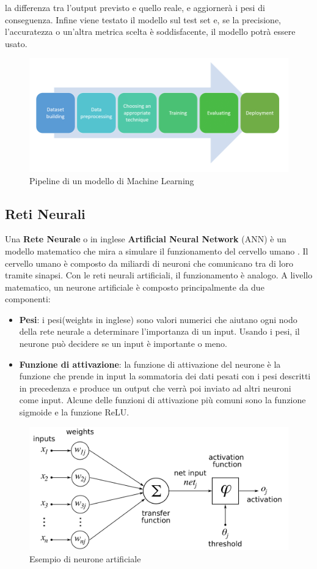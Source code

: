 \documentclass[12pt,a4paper,openright,twoside]{book}
\begin{document}
la differenza tra l'output previsto e quello reale, e aggiornerà i pesi di conseguenza.
Infine viene testato il modello sul test set e, se la precisione, l'accuratezza o un'altra metrica scelta
è soddisfacente, il modello potrà essere usato.
\begin{figure}[H]
    \centering
    \includegraphics[width=.8\linewidth]{figures/Machine-learning-pipeline.png}
    \caption{Pipeline di un modello di Machine Learning \cite{phdthesishamza}}
    \label{fig:ML pipeline}
\end{figure}

\subsection{Reti Neurali}

Una \textbf{Rete Neurale} o in inglese \textbf{Artificial Neural Network} (ANN) è
un modello matematico che mira a simulare il
funzionamento del cervello umano \cite{zou2009overview}.
Il cervello umano è composto da miliardi di neuroni
che comunicano tra di loro tramite sinapsi.
Con le reti neurali artificiali, il funzionamento
è analogo. A livello matematico, un neurone artificiale è composto principalmente
da due componenti:
\begin{itemize}
    \item \textbf{Pesi}: i pesi(weights in inglese) sono valori numerici che
    aiutano ogni nodo della rete neurale a determinare
    l'importanza di un input. Usando i pesi, il neurone
    può decidere se un input è importante o meno.
    \item \textbf{Funzione di attivazione}: la funzione di attivazione del neurone è la funzione
    che prende in input la sommatoria dei dati pesati con i pesi descritti in
    precedenza e produce un output che verrà poi inviato ad altri neuroni come
    input. Alcune delle funzioni di attivazione più comuni sono la funzione
    sigmoide e la funzione ReLU.
\end{itemize}

\begin{figure}[H]
    \centering
    \includegraphics[width=.8\linewidth]{figures/ArtificialNeuronModel.png}
    \caption{Esempio di neurone artificiale \cite{wiki:xxx}}
    \label{fig:AN}
\end{figure}
\end{document}
